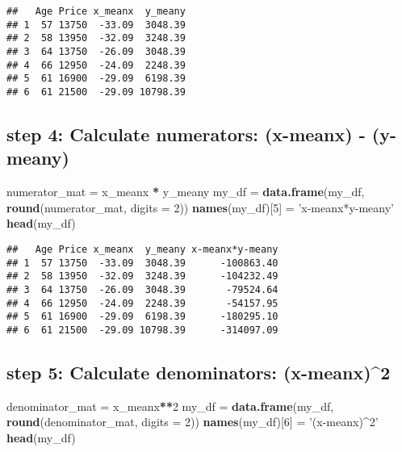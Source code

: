 \documentclass[]{article}
\newenvironment{Shaded}{\begin{snugshade}}{\end{snugshade}}
\newcommand{\DataTypeTok}[1]{\textcolor[rgb]{0.13,0.29,0.53}{#1}}
\newcommand{\DecValTok}[1]{\textcolor[rgb]{0.00,0.00,0.81}{#1}}
\newcommand{\KeywordTok}[1]{\textcolor[rgb]{0.13,0.29,0.53}{\textbf{#1}}}
\newcommand{\NormalTok}[1]{#1}
\newcommand{\OperatorTok}[1]{\textcolor[rgb]{0.81,0.36,0.00}{\textbf{#1}}}
\newcommand{\StringTok}[1]{\textcolor[rgb]{0.31,0.60,0.02}{#1}}
\begin{document}
\begin{verbatim}
##   Age Price x_meanx  y_meany
## 1  57 13750  -33.09  3048.39
## 2  58 13950  -32.09  3248.39
## 3  64 13750  -26.09  3048.39
## 4  66 12950  -24.09  2248.39
## 5  61 16900  -29.09  6198.39
## 6  61 21500  -29.09 10798.39
\end{verbatim}

\hypertarget{step-4-calculate-numerators-x-meanx---y-meany}{%
\subsection{step 4: Calculate numerators: (x-meanx) -
(y-meany)}\label{step-4-calculate-numerators-x-meanx---y-meany}}

\begin{Shaded}
\begin{Highlighting}[]
\NormalTok{numerator_mat =}\StringTok{ }\NormalTok{x_meanx }\OperatorTok{*}\StringTok{ }\NormalTok{y_meany}
\NormalTok{my_df =}\StringTok{ }\KeywordTok{data.frame}\NormalTok{(my_df, }\KeywordTok{round}\NormalTok{(numerator_mat, }\DataTypeTok{digits =} \DecValTok{2}\NormalTok{))}
\KeywordTok{names}\NormalTok{(my_df)[}\DecValTok{5}\NormalTok{] =}\StringTok{ 'x-meanx*y-meany'}
\KeywordTok{head}\NormalTok{(my_df)}
\end{Highlighting}
\end{Shaded}

\begin{verbatim}
##   Age Price x_meanx  y_meany x-meanx*y-meany
## 1  57 13750  -33.09  3048.39      -100863.40
## 2  58 13950  -32.09  3248.39      -104232.49
## 3  64 13750  -26.09  3048.39       -79524.64
## 4  66 12950  -24.09  2248.39       -54157.95
## 5  61 16900  -29.09  6198.39      -180295.10
## 6  61 21500  -29.09 10798.39      -314097.09
\end{verbatim}

\hypertarget{step-5-calculate-denominators-x-meanx2}{%
\subsection{step 5: Calculate denominators:
(x-meanx)\^{}2}\label{step-5-calculate-denominators-x-meanx2}}

\begin{Shaded}
\begin{Highlighting}[]
\NormalTok{denominator_mat =}\StringTok{ }\NormalTok{x_meanx}\OperatorTok{**}\DecValTok{2}
\NormalTok{my_df =}\StringTok{ }\KeywordTok{data.frame}\NormalTok{(my_df, }\KeywordTok{round}\NormalTok{(denominator_mat, }\DataTypeTok{digits =} \DecValTok{2}\NormalTok{))}
\KeywordTok{names}\NormalTok{(my_df)[}\DecValTok{6}\NormalTok{] =}\StringTok{ '(x-meanx)^2'}
\KeywordTok{head}\NormalTok{(my_df)}
\end{Highlighting}
\end{Shaded}
\end{document}
